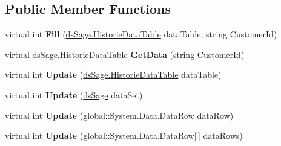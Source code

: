 \subsection*{Public Member Functions}
\begin{DoxyCompactItemize}
\item 
virtual int {\bfseries Fill} (\hyperlink{class_products_1_1_data_1_1ds_sage_1_1_historie_data_table}{ds\+Sage.\+Historie\+Data\+Table} data\+Table, string Customer\+Id)\hypertarget{class_products_1_1_data_1_1ds_sage_table_adapters_1_1ta_historie_adcc7b958966b5ca837271b036e34316a}{}\label{class_products_1_1_data_1_1ds_sage_table_adapters_1_1ta_historie_adcc7b958966b5ca837271b036e34316a}

\item 
virtual \hyperlink{class_products_1_1_data_1_1ds_sage_1_1_historie_data_table}{ds\+Sage.\+Historie\+Data\+Table} {\bfseries Get\+Data} (string Customer\+Id)\hypertarget{class_products_1_1_data_1_1ds_sage_table_adapters_1_1ta_historie_a947cb350552ffcb221fc3b7078fa9469}{}\label{class_products_1_1_data_1_1ds_sage_table_adapters_1_1ta_historie_a947cb350552ffcb221fc3b7078fa9469}

\item 
virtual int {\bfseries Update} (\hyperlink{class_products_1_1_data_1_1ds_sage_1_1_historie_data_table}{ds\+Sage.\+Historie\+Data\+Table} data\+Table)\hypertarget{class_products_1_1_data_1_1ds_sage_table_adapters_1_1ta_historie_ad68b2404517b5e3507be170819eea130}{}\label{class_products_1_1_data_1_1ds_sage_table_adapters_1_1ta_historie_ad68b2404517b5e3507be170819eea130}

\item 
virtual int {\bfseries Update} (\hyperlink{class_products_1_1_data_1_1ds_sage}{ds\+Sage} data\+Set)\hypertarget{class_products_1_1_data_1_1ds_sage_table_adapters_1_1ta_historie_a4ee377e8eb05cac1bbd84ec5702f938c}{}\label{class_products_1_1_data_1_1ds_sage_table_adapters_1_1ta_historie_a4ee377e8eb05cac1bbd84ec5702f938c}

\item 
virtual int {\bfseries Update} (global\+::\+System.\+Data.\+Data\+Row data\+Row)\hypertarget{class_products_1_1_data_1_1ds_sage_table_adapters_1_1ta_historie_a3ef3f9c243d1389501ee9c712a899fcb}{}\label{class_products_1_1_data_1_1ds_sage_table_adapters_1_1ta_historie_a3ef3f9c243d1389501ee9c712a899fcb}

\item 
virtual int {\bfseries Update} (global\+::\+System.\+Data.\+Data\+Row\mbox{[}$\,$\mbox{]} data\+Rows)\hypertarget{class_products_1_1_data_1_1ds_sage_table_adapters_1_1ta_historie_a4b413b87d0dd211070c31814b6eefe9b}{}\label{class_products_1_1_data_1_1ds_sage_table_adapters_1_1ta_historie_a4b413b87d0dd211070c31814b6eefe9b}

\end{DoxyCompactItemize}
